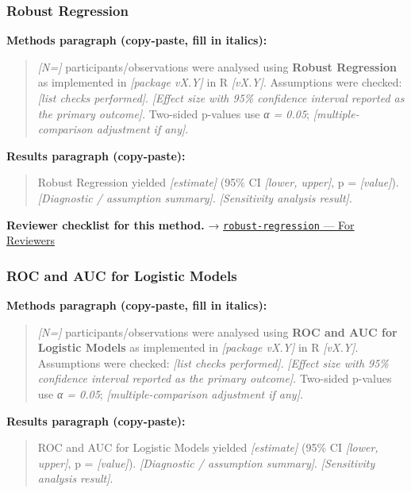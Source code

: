 \documentclass[
]{article}
\begin{document}
\subsubsection{Robust Regression}\label{robust-regression}

\textbf{Methods paragraph (copy-paste, fill in italics):}

\begin{quote}
\emph{{[}N={]}} participants/observations were analysed using
\textbf{Robust Regression} as implemented in \emph{{[}package vX.Y{]}}
in R \emph{{[}vX.Y{]}}. Assumptions were checked: \emph{{[}list checks
performed{]}}. \emph{{[}Effect size with 95\% confidence interval
reported as the primary outcome{]}}. Two-sided p-values use \emph{α =
0.05}; \emph{{[}multiple-comparison adjustment if any{]}}.
\end{quote}

\textbf{Results paragraph (copy-paste):}

\begin{quote}
Robust Regression yielded \emph{{[}estimate{]}} (95\% CI \emph{{[}lower,
upper{]}}, p = \emph{{[}value{]}}). \emph{{[}Diagnostic / assumption
summary{]}}. \emph{{[}Sensitivity analysis result{]}}.
\end{quote}

\textbf{Reviewer checklist for this method.} →
\href{../chapters/07-regression/robust-regression.Rmd\#for-reviewers}{\texttt{robust-regression}
--- For Reviewers}

\subsubsection{ROC and AUC for Logistic
Models}\label{roc-and-auc-for-logistic-models}

\textbf{Methods paragraph (copy-paste, fill in italics):}

\begin{quote}
\emph{{[}N={]}} participants/observations were analysed using
\textbf{ROC and AUC for Logistic Models} as implemented in
\emph{{[}package vX.Y{]}} in R \emph{{[}vX.Y{]}}. Assumptions were
checked: \emph{{[}list checks performed{]}}. \emph{{[}Effect size with
95\% confidence interval reported as the primary outcome{]}}. Two-sided
p-values use \emph{α = 0.05}; \emph{{[}multiple-comparison adjustment if
any{]}}.
\end{quote}

\textbf{Results paragraph (copy-paste):}

\begin{quote}
ROC and AUC for Logistic Models yielded \emph{{[}estimate{]}} (95\% CI
\emph{{[}lower, upper{]}}, p = \emph{{[}value{]}}). \emph{{[}Diagnostic
/ assumption summary{]}}. \emph{{[}Sensitivity analysis result{]}}.
\end{quote}
\end{document}
